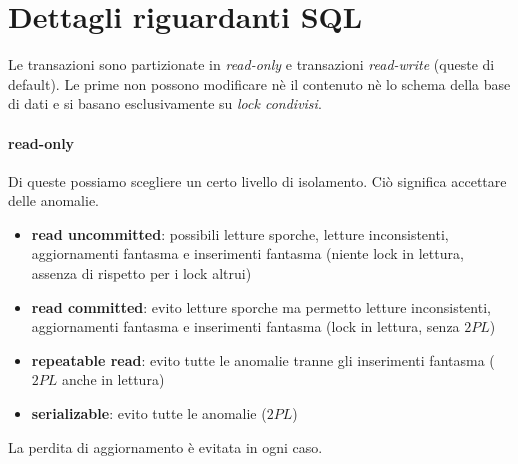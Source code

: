 \section{Dettagli riguardanti SQL}
Le transazioni sono partizionate in \emph{read-only} e transazioni \emph{read-write} (queste di default). Le prime non possono modificare nè il contenuto nè lo schema della base di dati e si basano esclusivamente su \emph{lock condivisi}.
\paragraph{read-only} Di queste possiamo scegliere un certo livello di isolamento. Ciò significa accettare delle anomalie.
\begin{itemize}
	\item \textbf{read uncommitted}: possibili letture sporche, letture inconsistenti, aggiornamenti fantasma e inserimenti fantasma (niente lock in lettura, assenza di rispetto per i lock altrui)
	\item \textbf{read committed}: evito letture sporche ma permetto letture inconsistenti, aggiornamenti fantasma e inserimenti fantasma (lock in lettura, senza $2PL$)
	\item \textbf{repeatable read}: evito tutte le anomalie tranne gli inserimenti fantasma ($2PL$ anche in lettura)
	\item \textbf{serializable}: evito tutte le anomalie ($2PL$)
\end{itemize}
La perdita di aggiornamento è evitata in ogni caso.
